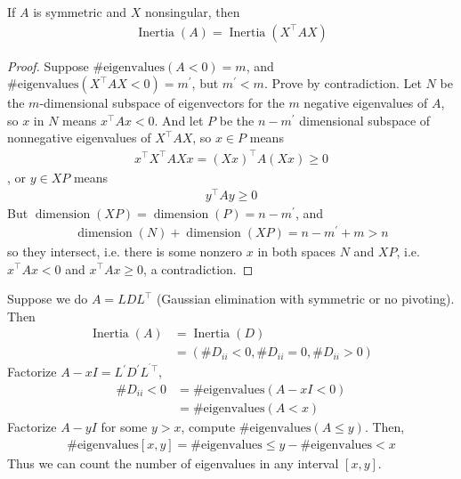 \documentclass[11pt]{article}
\numberwithin{equation}{section}
\begin{document}
\begin{theorem}\label{thm:sylvester}
    If $A$ is symmetric and $X$ nonsingular, then \begin{align*}
        \operatorname{Inertia}(A) = \operatorname{Inertia}(X^\top AX)    
    \end{align*}
    \begin{proof}
        Suppose $\#\text{eigenvalues}(A<0)=m$, and $\#\text{eigenvalues}(X^\top AX<0)=m^\prime$, but $m^\prime < m$. Prove by contradiction. 
        Let $N$ be the $m$-dimensional subspace of eigenvectors for the $m$ negative eigenvalues of $A$, so $x$ in $N$ means $x^\top Ax < 0$.
        And let $P$ be the $n-m^\prime$ dimensional subspace of nonnegative eigenvalues of $X^\top AX$, 
        so $x \in P$ means \begin{align*}
            x^\top X^\top AXx = (Xx)^\top A(Xx) \geq 0
        \end{align*}, or $y \in XP$ means \begin{align*}
            y^\top Ay \geq 0
        \end{align*}
        But $\operatorname{dimension}(XP) = \operatorname{dimension}(P) = n-m^\prime$, and
        \begin{align*}
            \operatorname{dimension}(N)+\operatorname{dimension}(XP) = n-m^\prime+m > n
        \end{align*}
        so they intersect, i.e. there is some nonzero $x$ in both spaces $N$ and $XP$,
        i.e. $x^\top Ax < 0$ and $x^\top Ax \geq 0$, a contradiction.
    \end{proof}
\end{theorem}

\begin{fact*}
    Suppose we do $A = LDL^\top$ (Gaussian elimination with symmetric or no pivoting). Then \begin{align*}
        \operatorname{Inertia}(A) &= \operatorname{Inertia}(D) \\
        &= (\#D_{ii}<0, \#D_{ii}=0, \#D_{ii}>0)
    \end{align*}
    Factorize $A-xI = L^\prime D^\prime L^{^\prime \top}$, \begin{align*}
        \#D_{ii}<0 &= \#\text{eigenvalues}(A-xI < 0) \\
        &= \#\text{eigenvalues}(A < x)
    \end{align*}
    Factorize $A-yI$ for some $y > x$, compute $\#\text{eigenvalues}(A \leq y)$. Then, \begin{align*}
        \#\text{eigenvalues}[x,y] = \#\text{eigenvalues}\leq y - \#\text{eigenvalues}<x
    \end{align*}
    Thus we can count the number of eigenvalues in any interval $[x,y]$. 
\end{fact*}
\end{document}
